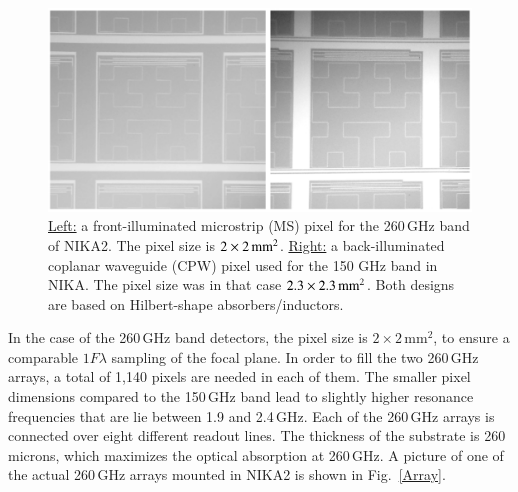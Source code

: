 \documentclass[]{aa} %
\begin{document}
\begin{figure}[h]
   \centering
  	\includegraphics[width=.95\linewidth]{fig3_AB.png}
     \caption{\underline{Left:} a front-illuminated microstrip (MS) pixel for the 260\,GHz band of NIKA2. The pixel size is $2\times2\textrm{\,mm}^2$. \underline{Right:} a back-illuminated coplanar waveguide (CPW) pixel used for the 150 GHz band in NIKA. The pixel size was in that case $2.3\times2.3\textrm{\,mm}^2$. Both designs are based on Hilbert-shape absorbers/inductors.}
         \label{Pixels}
\end{figure}

In the case of the 260\,GHz band detectors, the pixel size is $2\times 2\mathrm{\,mm}^2$, to ensure a comparable $1 F \lambda$ sampling of the focal plane. In order to fill the two 260\,GHz arrays, a total of 1,140 pixels are needed in each of them. The smaller pixel dimensions compared to the 150\,GHz band lead to slightly higher resonance frequencies that are lie between 1.9 and 2.4\,GHz. Each of the 260\,GHz arrays is connected over eight different readout lines. The thickness of the substrate is 260\,microns, which maximizes the optical absorption at 260\,GHz. A picture of one of the actual 260\,GHz arrays mounted in NIKA2 is shown in Fig.~\ref{Array}.
\end{document}
